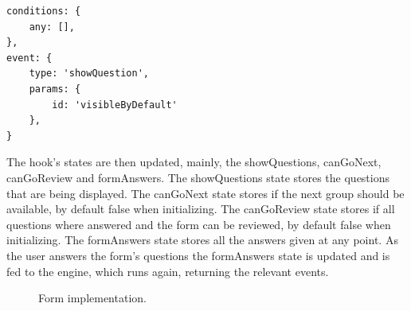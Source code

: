\begin{lstlisting}[style=sharpc, caption={Condition for visible by default questions}, label={default_question}]
conditions: {
	any: [],
},
event: {
	type: 'showQuestion',
	params: {
		id: 'visibleByDefault'
	},
}
\end{lstlisting}

The hook's states are then updated, mainly, the showQuestions, canGoNext, canGoReview and formAnswers. The showQuestions state stores the questions that are being displayed. The canGoNext state stores if the next group should be available,  by default false when initializing. The canGoReview state stores if all questions where answered and the form can be reviewed, by default false when initializing. The formAnswers state stores all the answers given at any point.
As the user answers the form's questions the formAnswers state is updated and is fed to the engine, which runs again, returning the relevant events.

\begin{figure}[h]
	\begin{center}
	\end{center}
	\caption{Form implementation.}\label{fig:form_implementation}
\end{figure}

